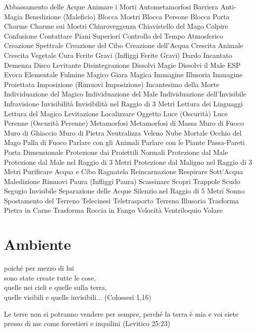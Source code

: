 \documentclass[12pt,a4paper,twoside,openany]{book}
\begin{document}
\begin{multicols}{2}
Abbassamento delle Acque
Animare i Morti
Autometamorfosi
Barriera Anti-Magia
Benedizione (Maleficio)
Blocca Mostri
Blocca Persone
Blocca Porta
Charme
Charme sui Mostri
Chiaroveggenza
Chiavistello del Mago
Colpire
Confusione
Contattare Piani Superiori
Controllo del Tempo Atmosferico
Creazione Spettrale
Creazione del Cibo
Creazione dell’Acqua
Crescita Animale
Crescita Vegetale
Cura Ferite Gravi (Infliggi Ferite Gravi)
Dardo Incantato
Demenza
Disco Levitante
Disintegrazione
Dissolvi Magie
Dissolvi il Male
ESP
Evoca Elementale
Fulmine Magico
Giara Magica
Immagine Illusoria
Immagine Proiettata
Imposizione (Rimuovi Imposizione)
Incantesimo della Morte
Individuazione del Magico
Individuazione del Male
Individuazione dell'Invisibile
Infravisione
Invisibilità
Invisibilità nel Raggio di 3 Metri
Lettura dei Linguaggi
Lettura del Magico
Levitazione
Localizzare Oggetto
Luce (Oscurità)
Luce Perenne (Oscurità Perenne)
Metamorfosi
Metamorfosi di Massa
Muro di Fuoco
Muro di Ghiaccio
Muro di Pietra
Neutralizza Veleno
Nube Mortale
Occhio del Mago
Palla di Fuoco
Parlare con gli Animali
Parlare con le Piante
Passa-Pareti
Porta Dimensionale
Protezione dai Proiettili Normali
Protezione dal Male
Protezione dal Male nel Raggio di 3 Metri
Protezione dal Maligno nel Raggio di 3 Metri
Purificare Acqua e Cibo
Ragnatela
Reincarnazione
Respirare Sott’Acqua
Maledizione
Rimuovi Paura (Infliggi Paura)
Scassinare
Scopri Trappole
Scudo
Segugio Invisibile
Separazione delle Acque
Silenzio nel Raggio di 5 Metri
Sonno
Spostamento del Terreno
Telecinesi
Teletrasporto
Terreno Illusorio
Trasforma Pietra in Carne
Trasforma Roccia in Fango
Velocità
Ventriloquio
Volare



\end{multicols}

\pagebreak

\section{Ambiente}

\label{ambiente}
\begin{changemargin}{0.3cm}{0.3cm}\begin{enfasi}{
poiché per mezzo di lui\\
sono state create tutte le cose,\\
quelle nei cieli e quelle sulla terra,\\
quelle visibili e quelle invisibili... (Colossesi 1,16)\\\medskip

Le terre non si potranno vendere per sempre, perché la terra è mia e voi siete presso di me come forestieri e inquilini (Levitico 25:23)
}\end{enfasi}\end{changemargin}\medskip
\end{document}
